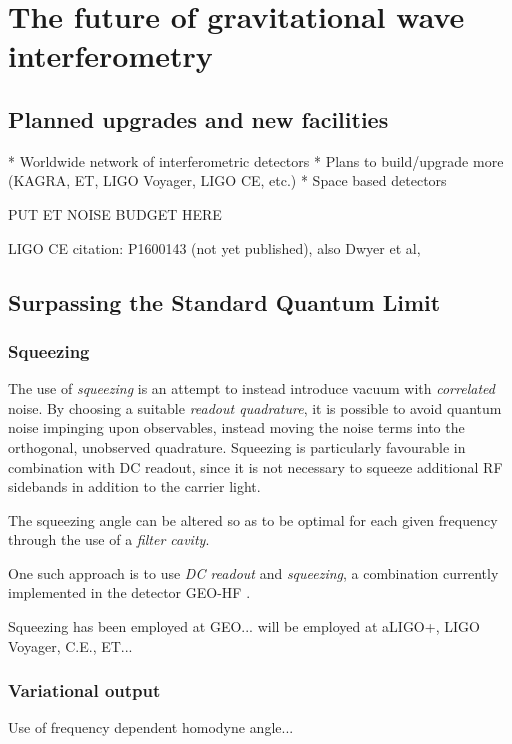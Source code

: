 \section{The future of gravitational wave interferometry}

\subsection{Planned upgrades and new facilities}
* Worldwide network of interferometric detectors
* Plans to build/upgrade more (KAGRA, ET, LIGO Voyager, LIGO CE, etc.)
* Space based detectors

PUT ET NOISE BUDGET HERE

LIGO CE citation: P1600143 (not yet published), also Dwyer et al, \cite{Dwyer2015}

\subsection{\label{sec:sub-sql-techniques}Surpassing the Standard Quantum Limit}



\subsubsection{\label{sec:squeezing}Squeezing}

The use of \emph{squeezing} is an attempt to instead introduce vacuum with \emph{correlated} noise. By choosing a suitable \emph{readout quadrature}, it is possible to avoid quantum noise impinging upon observables, instead moving the noise terms into the orthogonal, unobserved quadrature. Squeezing is particularly favourable in combination with DC readout, since it is not necessary to squeeze additional \gls{RF} sidebands in addition to the carrier light.

The squeezing angle can be altered so as to be optimal for each given frequency through the use of a \emph{filter cavity}.

One such approach is to use \emph{DC readout} and \emph{squeezing}, a combination currently implemented in the detector GEO-HF \cite{Willke2006, Affeldt2014}.

Squeezing has been employed at GEO... will be employed at aLIGO+, LIGO Voyager, C.E., ET...

\subsubsection{Variational output}
Use of frequency dependent homodyne angle...

